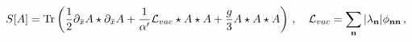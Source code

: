 \begin{equation}
S[A]=\mbox{Tr}\left( \frac{1}{2}\partial_{\bar{x}}A\star \partial_{\bar{x}%
}A+ \frac{1}{{\alpha^{\prime}}} \mathcal{L}_{vac}\star A\star A+\frac{g}{3}%
A\star A\star A\right)\,, \quad \mathcal{L}_{vac}=\sum_{\mathbf{n}}|\lambda_{%
\mathbf{n}}| \phi_{\mathbf{nn}}\,,
\end{equation}

